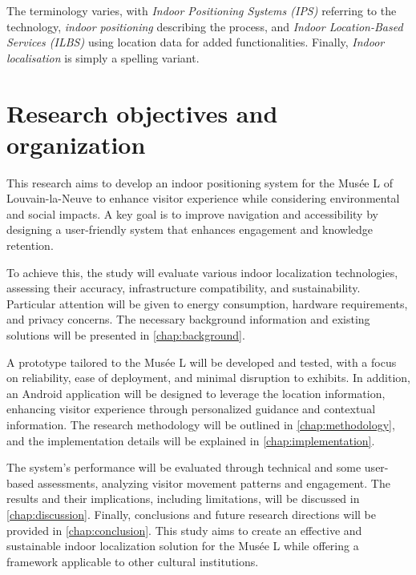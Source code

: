 The terminology varies, with \textit{Indoor Positioning Systems (IPS)} referring to the technology, \textit{indoor positioning} describing the process, and \textit{Indoor Location-Based Services (ILBS)} using location data for added functionalities. Finally, \textit{Indoor localisation} is simply a spelling variant. 

\section{Research objectives and organization}



This research aims to develop an indoor positioning system for the Musée L of Louvain-la-Neuve to enhance visitor experience while considering environmental and social impacts. A key goal is to improve navigation and accessibility by designing a user-friendly system that enhances engagement and knowledge retention. 

To achieve this, the study will evaluate various indoor localization technologies, assessing their accuracy, infrastructure compatibility, and sustainability. Particular attention will be given to energy consumption, hardware requirements, and privacy concerns. The necessary background information and existing solutions will be presented in \autoref{chap:background}.

A prototype tailored to the Musée L will be developed and tested, with a focus on reliability, ease of deployment, and minimal disruption to exhibits. In addition, an Android application will be designed to leverage the location information, enhancing visitor experience through personalized guidance and contextual information. The research methodology will be outlined in \autoref{chap:methodology}, and the implementation details will be explained in \autoref{chap:implementation}.

The system’s performance will be evaluated through technical and some user-based assessments, analyzing visitor movement patterns and engagement. The results and their implications, including limitations, will be discussed in \autoref{chap:discussion}. Finally, conclusions and future research directions will be provided in \autoref{chap:conclusion}. This study aims to create an effective and sustainable indoor localization solution for the Musée L while offering a framework applicable to other cultural institutions.
